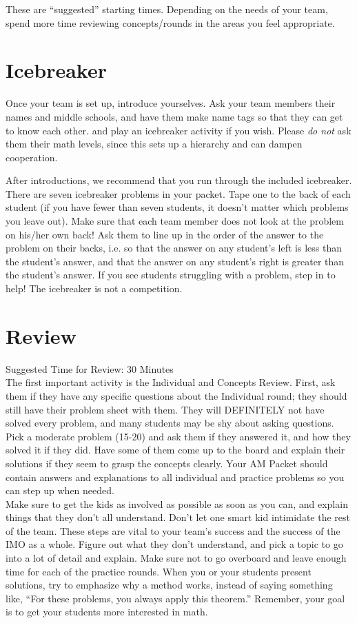 \documentclass[11pt]{article}
\begin{document}
\begin{small}
\noindent *These are ``suggested'' starting times.  Depending on the needs of your team, spend more time reviewing concepts/rounds in the areas you feel appropriate.

\section{Icebreaker}

Once your team is set up, introduce yourselves. Ask your team members their names and middle schools, and have them make name tags so that they can get to know each other. and play an icebreaker activity if you wish. Please \emph{do not} ask them their math levels, since this sets up a hierarchy and can dampen cooperation.

After introductions, we recommend that you run through the included icebreaker. There are seven icebreaker problems in your packet. Tape one to the back of each student (if you have fewer than seven students, it doesn't matter which problems you leave out). Make sure that each team member does not look at the problem on his/her own back! Ask them to line up in the order of the answer to the problem on their backs, i.e. so that the answer on any student's left is less than the student's answer, and that the answer on any student's right is greater than the student's answer. If you see students struggling with a problem, step in to help! The icebreaker is not a competition.

\section{Review}
Suggested Time for Review: 30 Minutes \\
\noindent The first important activity is the Individual and Concepts Review.  First, ask them if they have any specific questions about the Individual round; they should still have their problem sheet with them.  They will DEFINITELY not have solved every problem, and many students may be shy about asking questions.  Pick a moderate problem (15-20) and ask them if they answered it, and how they solved it if they did.  Have some of them come up to the board and explain their solutions if they seem to grasp the concepts clearly.  Your AM Packet should contain answers and explanations to all individual and practice problems so you can step up when needed.  \\
\indent Make sure to get the kids as involved as possible as soon as you can, and explain things that they don't all understand. Don't let one smart kid intimidate the rest of the team. These steps are vital to your team's success and the success of the IMO as a whole.  Figure out what they don't understand, and pick a topic to go into a lot of detail and explain. Make sure not to go overboard and leave enough time for each of the practice rounds.
\indent When you or your students present solutions, try to emphasize why a method works, instead of saying something like, ``For these problems, you always apply this theorem.'' Remember, your goal is to get your students more interested in math.


\end{small}
\end{document}
